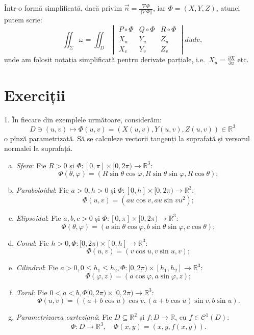 \documentclass[11pt,a4paper]{article}
\newcommand\kal{\mathcal}
\newcommand\seq{\subseteq}
\newcommand\RR{\mathbb{R}}
\theoremstyle{dotless}
\theoremstyle{dotlessdr}
\begin{document}
Într-o formă simplificată, dacă privim $\vec{n} = \frac{\nabla \Phi}{||\nabla \Phi||}$,
iar $\Phi = (X, Y, Z)$, atunci putem scrie:
\[
  \iint_\Sigma \omega = \iint_D
  \begin{vmatrix}
    P \circ \Phi & Q \circ \Phi & R \circ \Phi \\
    X_u & Y_u & Z_u \\
    X_v & Y_v & Z_v
  \end{vmatrix} dudv,
\]
unde am folosit notația simplificată pentru derivate parțiale, i.e.\
$X_u = \frac{\partial X}{\partial u}$ etc.


\section{Exerciții}
\label{sec:exc}

1. În fiecare din exemplele următoare, considerăm:
\[
  D \ni (u,v) \mapsto \Phi(u,v) = (X(u,v), Y(u,v), Z(u,v)) \in \RR^3
\]
o pînză parametrizată. Să se calculeze vectorii tangenți la suprafață și
versorul normalei la suprafață.

\begin{enumerate}[(a)]
\item \emph{Sfera}: Fie $R > 0$ și $\Phi : [0, \pi] \times [0, 2\pi) \to \RR^3$:
  \[
    \Phi(\theta, \varphi) = (R\sin \theta \cos \varphi, R \sin \theta \sin \varphi, R \cos \theta);
  \]
\item \emph{Paraboloidul}: Fie $a > 0, h > 0$ și $\Phi : [0, h] \times [0, 2\pi) \to \RR^3$:
  \[
    \Phi(u, v) = (au\cos v, au\sin v u^2);
  \]
\item \emph{Elipsoidul}: Fie $a, b, c > 0$ și $\Phi : [0, \pi] \times [0, 2\pi) \to \RR^3$:
  \[
    \Phi(\theta, \varphi) = (a \sin\theta \cos \varphi, b \sin \theta \sin \varphi, c \cos \theta);
  \]
\item \emph{Conul}: Fie $h > 0, \Phi : [0, 2\pi) \times [0, h] \to \RR^3$:
  \[
    \Phi(u, v) = (v \cos u, v \sin u, v);
  \]
\item \emph{Cilindrul}: Fie $a > 0, 0 \leq h_1 \leq h_2, \Phi : [0, 2\pi) \times [h_1, h_2] \to \RR^3$:
  \[
    \Phi(\varphi, z) = (a \cos \varphi, a \sin \varphi, z);
  \]
\item \emph{Torul}: Fie $0 < a < b, \Phi [0, 2\pi) \times [0, 2\pi) \to \RR^3$:
  \[
    \Phi(u, v) = ((a + b\cos u) \cos v, (a + b \cos u) \sin v, b \sin u).
  \]
\item \emph{Parametrizarea carteziană}: Fie $D \seq \RR^2$ și $f : D \to \RR$, cu
  $f \in \kal{C}^1(D)$:
  \[
    \Phi : D \to \RR^3, \quad \Phi(x, y) = (x, y, f(x,y)).
  \]
\end{enumerate}
\end{document}
